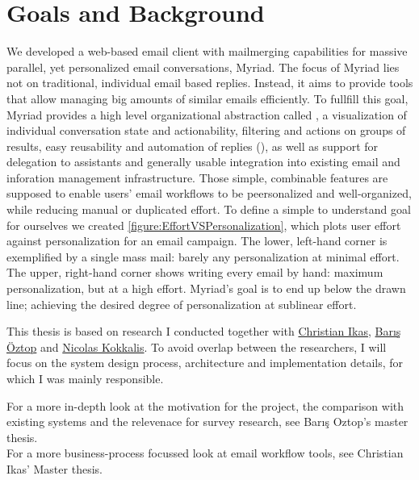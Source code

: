 \section{Goals and Background}

We developed a web-based email client with mailmerging capabilities for massive parallel, yet personalized email conversations, Myriad. The focus of Myriad lies not on traditional, individual email based replies. Instead, it aims to provide tools that allow managing big amounts of similar emails efficiently.
To fullfill this goal, Myriad provides a high level organizational abstraction called , a visualization of individual conversation state and actionability, filtering and actions on groups of results, easy reusability and automation of replies (), as well as support for delegation to assistants and generally usable integration into existing email and inforation management infrastructure.
Those simple, combinable features are supposed to enable users' email workflows to be peersonalized and well-organized, while reducing manual or duplicated effort. To define a simple to understand goal for ourselves we created \autoref{figure:EffortVSPersonalization}, which plots user effort against personalization for an email campaign. The lower, left-hand corner is exemplified by a single mass mail: barely any personalization at minimal effort. The upper, right-hand corner shows writing every email by hand: maximum personalization, but at a high effort. Myriad's goal is to end up below the drawn line; achieving the desired degree of personalization at sublinear effort.


This thesis is based on research I conducted together with \href{mailto:ikas@in.tum.de}{Christian Ikas}, \href{mailto:boztop@gmail.com}{Barış Öztop} and \href{mailto:nicolas@cs.stanford.edu}{Nicolas Kokkalis}. To avoid overlap between the researchers, I will focus on the system design process, architecture and implementation details, for which I was mainly responsible.

For a more in-depth look at the motivation for the project, the comparison with existing systems and the relevenace for survey research, see Barış Oztop's master thesis.\\
For a more business-process focussed look at email workflow tools, see Christian Ikas' Master thesis.

